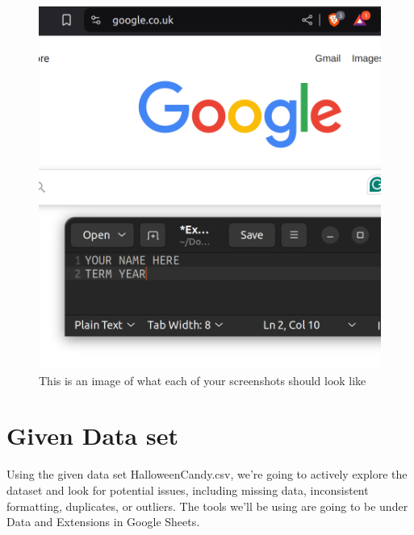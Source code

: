 \documentclass[12pt]{article}
\begin{document}
\begin{figure}[h!]
    \centerline{\includegraphics[scale=.2]{ExampleScreenshot.png}}
    \caption{This is an image of what each of your screenshots should look like}

    \end{figure} 



\section*{Given Data set}

Using the given data set HalloweenCandy.csv, we're going to actively explore the dataset and look for potential issues, including missing data, inconsistent formatting, duplicates, or outliers. The tools we'll be using are going to be under Data and Extensions in Google Sheets. 
\end{document}
